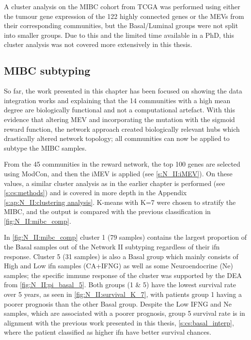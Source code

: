 A cluster analysis on the MIBC cohort from TCGA was performed using either the tumour gene expression of the 122 highly connected genes or the MEVs from their corresponding communities, but the Basal/Luminal groups were not split into smaller groups. Due to this and the limited time available in a PhD, this cluster analysis was not covered more extensively in this thesis.



\subsection{MIBC subtyping}

So far, the work presented in this chapter has been focused on showing the data integration works and explaining that the 14 communities with a high mean degree are biologically functional and not a computational artefact. With this evidence that altering MEV and incorporating the mutation with the sigmoid reward function, the network approach created biologically relevant hubs which drastically altered network topology; all communities can now be applied to subtype the MIBC samples.

From the 45 communities in the reward network, the top 100 genes are selected using ModCon, and then the iMEV is applied (see \cref{s:N_II:iMEV}). On these values, a similar cluster analysis as in the earlier chapter is performed (see \cref{s:cs:methods}) and is covered in more depth in the Appendix \cref{s:ap:N_II:clustering analysis}. K-means with K=7 were chosen to stratify the MIBC, and the output is compared with the previous classification in \cref{fig:N_II:mibc_comp}.

In \cref{fig:N_II:mibc_comp} cluster 1 (79 samples) contains the largest proportion of the Basal samples out of the Network II subtyping regardless of their \acrlong{ifn} response. Cluster 5 (31 samples) is also a Basal group which mainly consists of High and Low \acrshort{ifn} samples (CA+IFNG) as well as some Neuroendocrine (Ne) samples; the specific immune response of the cluster was supported by the DEA from \cref{fig:N_II:pi_basal_5}. Both groups (1 \& 5) have the lowest survival rate over 5 years, as seen in \cref{fig:N_II:survival_K_7}, with patients group 1 having a poorer prognosis than the other Basal group. Despite the Low IFNG and Ne samples, which are associated with a poorer prognosis, group 5 survival rate is in alignment with the previous work presented in this thesis, \cref{s:cs:basal_interp}, where the patient classified as higher \acrshort{ifn} have better survival chances.

